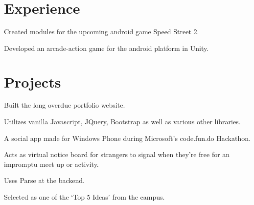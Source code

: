 \documentclass[a4paper]{resume}
\begin{document}
\begin{minipage}[t]{0.66\textwidth} %


\section{Experience}


\vspace{\topsep} %
\begin{tightitemize}
\item Created modules for the upcoming android game Speed Street 2.
\item Developed an arcade-action game for the android platform in Unity.
\end{tightitemize}

\sectionspace %


\section{Projects}



\begin{tightitemize}
\item Built the long overdue portfolio website.
\item Utilizes vanilla Javascript, JQuery, Bootstrap as well as various other libraries.
\end{tightitemize}

\sectionspace %




\begin{tightitemize}
\item A social app made for Windows Phone during Microsoft’s code.fun.do Hackathon.
\item Acts as virtual notice board for strangers to signal when they’re free for an impromptu meet up or activity.
\item Uses Parse at the backend.
\item Selected as one of the ‘Top 5 Ideas’ from the campus.
\end{tightitemize}


\end{minipage}
\end{document}
